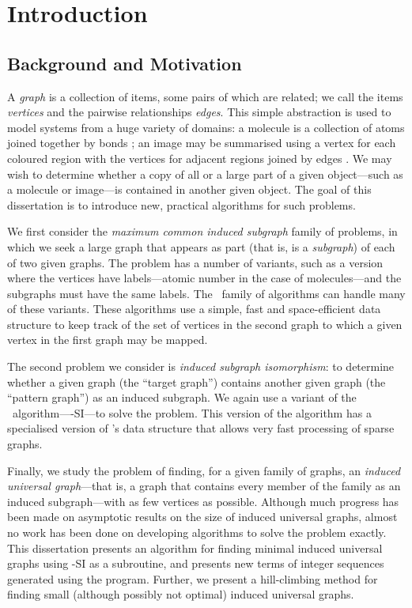 \chapter{Introduction}
\label{c:intro}

\newcommand{\ChapterRef}[1] {\Cref{#1}: \nameref{#1}}

\section{Background and Motivation}
A \emph{graph} is a collection of items, some pairs of which are related; we
call the items \emph{vertices} and the pairwise relationships \emph{edges}.
This simple abstraction
is used to model systems from a huge variety of domains: a molecule is a
collection of atoms joined together by bonds \citep{sussenguth1965graph}; an
image may be summarised using a vertex for each coloured region with the
vertices for adjacent regions joined by edges
\citep{DBLP:conf/icip/OlatunbosunDE96}.  We may wish to determine whether a
copy of all
or a large part of a given object---such as a molecule or image---is contained
in another given object.  The goal of this dissertation is to introduce new,
practical algorithms for such problems.

We first consider the \emph{maximum common induced subgraph} family of
problems, in which we seek a large graph that appears as part (that is,
is a \emph{subgraph}) of each of two
given graphs.  The problem has a number of variants, such as a version where
the vertices have labels---atomic number in the case of molecules---and
the subgraphs must have the same labels.
The \McSplit\ family of algorithms can handle many of these variants.  These algorithms
use a simple, fast and space-efficient data structure to keep track of the set
of vertices in the second graph to which a given vertex in the first graph may
be mapped.

The second problem we consider is \emph{induced subgraph isomorphism}: to
determine whether a given graph (the ``target graph'') contains another given
graph (the ``pattern graph'') as an induced subgraph.  We again use a variant
of the \McSplit\ algorithm---\McSplit-SI---to solve the problem. This version
of the algorithm has a specialised version of \McSplit's data structure that
allows very fast processing of sparse graphs.

Finally, we study the problem of finding, for a given family of graphs,
an \textit{induced universal graph}---that is, a graph that contains every
member of the family as an induced subgraph---with as few vertices as
possible.
Although much progress has
been made on asymptotic results on the size of induced universal graphs, almost no
work has been done on developing algorithms to solve the problem exactly.  This
dissertation presents an algorithm for finding minimal induced universal graphs
using \McSplit-SI as a subroutine, and presents new terms of integer sequences
generated using the program.  Further, we present a hill-climbing method for
finding small (although possibly not optimal) induced universal graphs.

